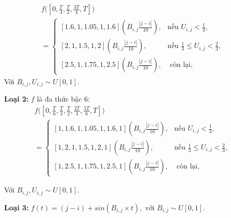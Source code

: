 \documentclass[../main.tex]{subfiles}
\begin{document}
\begin{multline}
   f\big([0, \frac{T}{4}, \frac{T}{2}, \frac{3T}{4}, T]\big) \\
   =
   \begin{cases} 
    [1.6, 1, 1.05, 1, 1.6](B_{i,j} \frac{|j − i|}{10}), & \text {nếu } U_{i,j} < \frac{1}{3}, \\ 
    [2, 1, 1.5, 1, 2](B_{i,j} \frac{|j − i|}{10}), & \text {nếu } \frac{1}{3} \leq U_{i,j} < \frac{2}{3}, \\ 
    [2.5, 1, 1.75, 1, 2.5](B_{i,j} \frac{|j − i|}{10}), & \text{ còn lại},
    \end{cases}
    \end{multline}
    Với \(B_{i, j}, U_{i, j} \sim U[0, 1]\).

\textbf{Loại 2:} \(f\) là đa thức bậc $6$:
\begin{multline}
    f\big([0, \frac{T}{6}, \frac{T}{3}, \frac{T}{2}, \frac{2T}{3}, \frac{5T}{6}, T]\big) \\
    = 
    \begin{cases} 
    [1, 1.6, 1, 1.05, 1, 1.6, 1](B_{i,j} \frac{|j − i|}{10}), & \text {nếu }  U_{i,j} < \frac{1}{3}, \\ 
    [1, 2, 1, 1.5, 1, 2, 1](B_{i,j} \frac{|j − i|}{10}), & \text {nếu } \frac{1}{3} \leq U_{i,j} < \frac{2}{3}, \\ 
    [1, 2.5, 1, 1.75, 1, 2.5, 1](B_{i,j} \frac{|j − i|}{10}), & \text{ còn lại},
    \end{cases}
\end{multline}

Với \(B_{i, j}, U_{i, j} \sim U[0, 1]\).

\textbf{Loại 3:} 
\(f(t) = (j − i) + sin (B_{i,j} \times t), \text{ với } B_{i,j} \sim U[0, 1].\)

\end{document}
